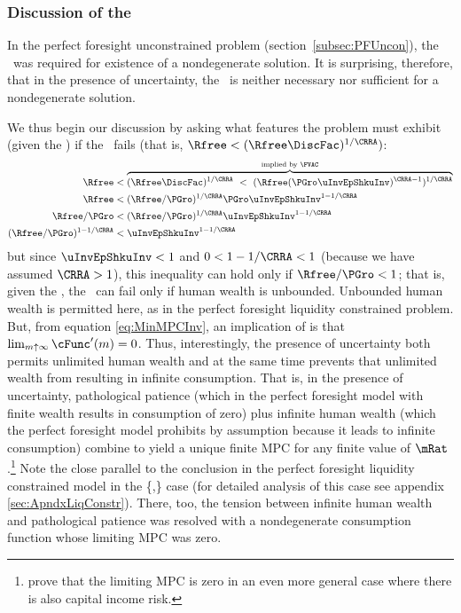 \documentclass[BufferStockTheory]{subfiles}
\begin{document}
\hypertarget{IntuitionRIC}{}
\subsubsection{Discussion of the \RIC}

In the perfect foresight unconstrained problem
(section~\ref{subsec:PFUncon}), the \RIC~was required for existence of
a nondegenerate solution.  It is surprising, therefore, that in the
presence of uncertainty, the \RIC~is neither necessary nor sufficient
for a nondegenerate solution.
\begin{comment}
  But if the \RIC~does hold, some useful results can be derived.  Arguably
  the most fundamental are that the limiting values
  for the minimal and maximal marginal propensities to consume implicit in
  \eqref{eq:MaxMPCInv} and \eqref{eq:MinMPCInv} are positive and finite.
\end{comment}
We thus begin our discussion by asking what features the problem must
exhibit (given the \FVAC) if the \RIC~fails (that is, $\Rfree < (\Rfree \DiscFac)^{1/\CRRA})$:
\begin{align}
  \Rfree   & < \overbrace{(\Rfree \DiscFac)^{1/\CRRA} ~ < ~ (\Rfree (\PGro \uInvEpShkuInv)^{\CRRA-1})^{1/\CRRA}}^{\text{implied by \FVAC}} \notag
  \\  \Rfree   & < (\Rfree/\PGro)^{1/\CRRA}\PGro \uInvEpShkuInv^{1-1/\CRRA} \notag
  \\  \Rfree/\PGro  & < (\Rfree/\PGro)^{1/\CRRA}\uInvEpShkuInv^{1-1/\CRRA} \notag
  \\  (\Rfree/\PGro)^{1-1/\CRRA}  & < \uInvEpShkuInv^{1-1/\CRRA} \label{eq:RICimplies}
\end{align}
but since $\uInvEpShkuInv<1$ and $0 < 1-1/\CRRA < 1$ (because we have
assumed $\CRRA > 1$), this inequality can hold only if $\Rfree/\PGro < 1$; that
is, given the \FVAC, the \RIC~can fail only if human wealth is
unbounded.  Unbounded human wealth is permitted here, as in the
perfect foresight liquidity constrained problem.  But,
from  equation
\eqref{eq:MinMPCInv}, an implication of \cncl{\RIC} is that $\lim_{m
  \uparrow \infty} \cFunc^{\prime}(m) = 0$.  Thus, interestingly,
the presence of uncertainty both permits unlimited human wealth and at
the same time prevents that unlimited wealth from resulting in
infinite consumption.  That is, in the presence of uncertainty,
pathological patience (which in the perfect foresight model with
finite wealth results in consumption of zero) plus infinite human
wealth (which the perfect foresight model prohibits by assumption because it leads
to infinite consumption) combine to yield a unique finite
MPC for any finite value of $\mRat$.\footnote{\cite{maTodaRich} prove that the limiting MPC is zero
in an even more general case where there is also capital income risk.}  Note
the close parallel to the conclusion in the perfect foresight
liquidity constrained model in the
\{\PFGIC,\cncl{\RIC}\} case (for detailed analysis of this
case see appendix \ref{sec:ApndxLiqConstr}).  There, too, the tension between infinite human wealth
and pathological patience was resolved with a nondegenerate consumption function
whose limiting MPC was zero.
\end{document}
